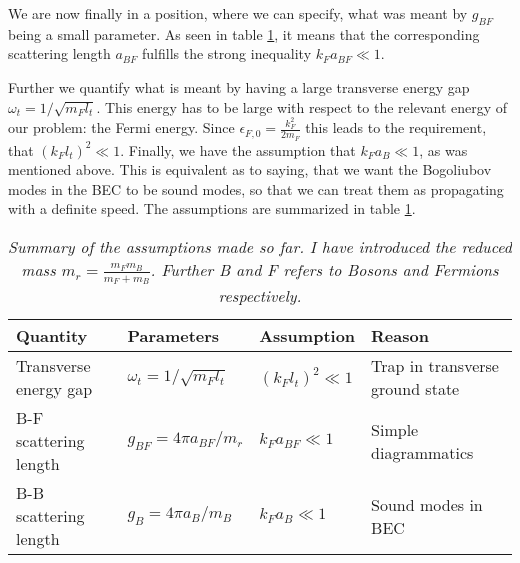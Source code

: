 We are now finally in a position, where we can specify, what was meant by $g_{BF}$ being a small parameter. As seen in table \ref{tab.assumptions}, it means that the corresponding scattering length $a_{BF}$ fulfills the strong inequality $k_F a_{BF} \ll 1$. 

Further we quantify what is meant by having a large transverse energy gap $\omega_t = 1/\sqrt{m_Fl_t}$. This energy has to be large with respect to the relevant energy of our problem: the Fermi energy. Since $\epsilon_{F,0} = \frac{k_F^2}{2m_F}$ this leads to the requirement, that $(k_Fl_t)^2\ll 1$. Finally, we have the assumption that $k_Fa_B \ll 1$, as was mentioned above. This is equivalent as to saying, that we want the Bogoliubov modes in the BEC to be sound modes, so that we can treat them as propagating with a definite speed. The assumptions are summarized in table \ref{tab.assumptions}.

\begin{table}[htb]
\centering
\caption{\textit{Summary of the assumptions made so far. I have introduced the reduced mass $m_r = \frac{m_Fm_B}{m_F+m_B}$. Further B and F refers to Bosons and Fermions respectively.}}
\begin{tabular}{|l|l|l|l|}
\hline \textbf{Quantity} & \textbf{Parameters} & \textbf{Assumption}			& \textbf{Reason}	\\
\hline Transverse energy gap & $\omega_t = 1/\sqrt{m_Fl_t}$ & $(k_Fl_t)^2\ll 1$ & Trap in transverse ground state \\
\hline B-F scattering length& $g_{BF} = 4\pi a_{BF}/m_r$ 	& $k_Fa_{BF} \ll 1$	& Simple diagrammatics\\
\hline B-B scattering length  & $g_B = 4\pi a_B/m_B$		& $k_Fa_B 	 \ll 1$	& Sound modes in BEC  \\
\hline 
\end{tabular}
\label{tab.assumptions}
\end{table}

